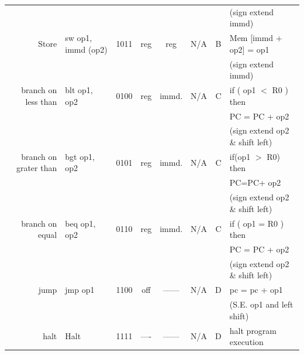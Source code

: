 \begin{table}[htbp]
\begin{tabular}{r | l c c c c c p{5cm}}
                                  &                    &      &      &        &      &   & (sign extend immd) \\
            Store                 & sw op1, immd (op2) & 1011 & reg  & reg    & N/A  & B & Mem [immd + op2] = op1 \\
                                  &                    &      &      &        &      &   & (sign extend immd) \\
            \hline
            branch on less than   & blt op1, op2       & 0100 & reg  & immd.  & N/A  & C & if ( op1 $<$ R0 ) then \\
                                  &                    &      &      &        &      &   & PC = PC + op2\\
                                  &                    &      &      &        &      &   & (sign extend op2 \& shift left) \\
            branch on grater than & bgt op1, op2       & 0101 & reg  & immd.  & N/A  & C & if(op1 $>$ R0) then \\
                                  &                    &      &      &        &      &   & PC=PC+ op2 \\
                                  &                    &      &      &        &      &   & (sign extend op2 \& shift left) \\
            branch on equal       & beq op1, op2       & 0110 & reg  & immd.  & N/A  & C & if ( op1 = R0 ) then \\
                                  &                    &      &      &        &      &   & PC = PC + op2 \\
                                  &                    &      &      &        &      &   & (sign extend op2 \& shift left) \\
            \hline
            jump                  & jmp op1            & 1100 & off  & ------ & N/A  & D & pc = pc + op1 \\
                                  &                    &      &      &        &      &   & (S.E. op1 and left shift) \\
            halt                  & Halt               & 1111 & ---- & ------ & N/A  & D & halt program execution \\
            \hline
        \end{tabular}
    \end{table}

